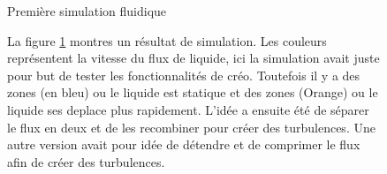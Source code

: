 \documentclass[a4paper, 11pt]{article}
\begin{document}
\begin{multicols}{2}
    \begin{figure}[H]
        \centering
        \caption{Première simulation fluidique}
        \label{fig:simulation2}
    \end{figure}
    \begin{figure}[H]
        La figure \ref{fig:simulation2} montres un résultat de simulation.
        Les couleurs représentent la vitesse du flux de liquide, ici la simulation avait juste pour but de
        tester les fonctionnalités de créo. Toutefois il y a des zones (en bleu) ou le liquide est statique
        et des zones (Orange) ou le liquide ses deplace plus rapidement.
        L'idée a ensuite été de séparer le flux en deux et de les recombiner pour créer des turbulences.
        Une autre version avait pour idée de détendre et de comprimer le flux afin de créer des
        turbulences.
    \end{figure}
\end{multicols}
\end{document}
